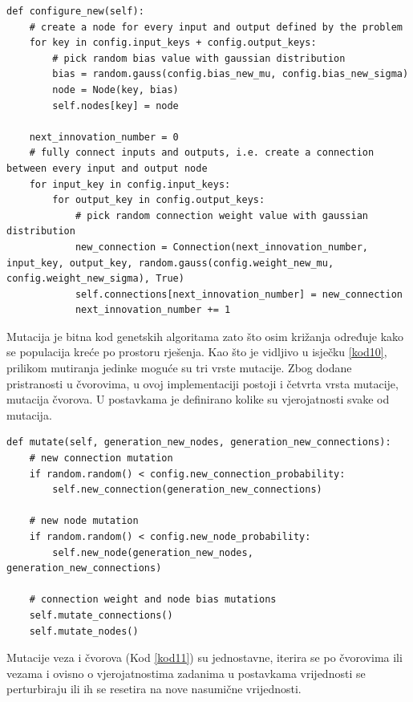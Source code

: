 \documentclass[times, utf8, diplomski, numeric]{fer}
\begin{document}
\begin{lstlisting}[frame=single, label=kod9, caption=Izvorni tekst metode \textit{configure\_new} u klasi \textit{Individual}]
def configure_new(self):
	# create a node for every input and output defined by the problem
	for key in config.input_keys + config.output_keys:
		# pick random bias value with gaussian distribution
		bias = random.gauss(config.bias_new_mu, config.bias_new_sigma)
		node = Node(key, bias)
		self.nodes[key] = node

	next_innovation_number = 0
	# fully connect inputs and outputs, i.e. create a connection between every input and output node
	for input_key in config.input_keys:
		for output_key in config.output_keys:
			# pick random connection weight value with gaussian distribution
			new_connection = Connection(next_innovation_number, input_key, output_key, random.gauss(config.weight_new_mu, config.weight_new_sigma), True)
			self.connections[next_innovation_number] = new_connection
			next_innovation_number += 1
\end{lstlisting}

Mutacija je bitna kod genetskih algoritama zato što osim križanja određuje kako se populacija kreće po prostoru rješenja. Kao što je vidljivo u isječku \ref{kod10}, prilikom mutiranja jedinke moguće su tri vrste mutacije. Zbog dodane pristranosti u čvorovima, u ovoj implementaciji postoji i četvrta vrsta mutacije, mutacija čvorova. U postavkama je definirano kolike su vjerojatnosti svake od mutacija.

\begin{lstlisting}[frame=single, label=kod10, caption=Izvorni tekst metode \textit{mutate} u klasi \textit{Individual}]
def mutate(self, generation_new_nodes, generation_new_connections):
	# new connection mutation
	if random.random() < config.new_connection_probability:
		self.new_connection(generation_new_connections)

	# new node mutation
	if random.random() < config.new_node_probability:
		self.new_node(generation_new_nodes, generation_new_connections)

	# connection weight and node bias mutations
	self.mutate_connections()
	self.mutate_nodes()
\end{lstlisting}

Mutacije veza i čvorova (Kod \ref{kod11}) su jednostavne, iterira se po čvorovima ili vezama i ovisno o vjerojatnostima zadanima u postavkama vrijednosti se perturbiraju ili ih se resetira na nove nasumične vrijednosti.
\end{document}
